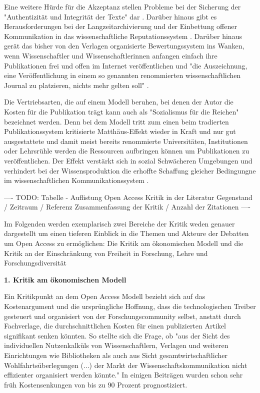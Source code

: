 Eine weitere Hürde für die Akzeptanz stellen Probleme bei der Sicherung der "Authentizität und Integrität der Texte" dar \cite{weishaupt_2009_goldenOA}. Darüber hinaus gibt es Herausforderungen bei der Langzeitarchivierung \cite{hagner_2015_sache_buches} \cite{Martin_2013} und der Einbettung offener Kommunikation in das wissenschaftliche Reputationssystem \cite{weishaupt_2009_goldenOA} \cite{Suber_2002} \cite{Adema_2014_open_access}. Darüber hinaus gerät das bisher von den Verlagen organisierte Bewertungssystem ins Wanken, wenn Wissenschaftler und Wissenschaftlerinnen anfangen einfach ihre Publikationen frei und offen im Internet veröffentlichen und "die Auszeichnung, eine Veröffentlichung in einem so genannten renommierten wissenschaftlichen Journal zu platzieren, nichts mehr gelten soll" \cite{Schirmbacher_oa_2007}.

Die Vertriebsarten, die auf einem Modell beruhen, bei denen der Autor die Kosten für die Publikation trägt kann auch als "Sozialismus für die Reichen" \cite{cope2014future} bezeichnet werden. Denn bei dem Modell tritt zum einen beim tradierten Publikationssystem kritisierte Matthäus-Effekt wieder in Kraft und nur gut ausgestattete und damit meist bereits renommierte Universitäten, Institutionen oder Lehrsrühle werden die Ressourcen aufbringen können um Publikationen zu veröffentlichen. Der Effekt verstärkt sich in sozial Schwächeren Umgebungen und verhindert bei der Wissensproduktion die erhoffte Schaffung gleicher Bedingungne im wissenschaftlichen Kommunikationssystem \cite{suchen}.

---- TODO: Tabelle - Auflistung Open Access Kritik in der Literatur
Gegenstand / Zeitraum / Referenz Zusammenfassung der Kritik / Anzahl der Zitationen ----

Im Folgenden werden exemplarisch zwei Bereiche der Kritik weden genauer dargestellt um einen tieferen Einblick in die Themen und Akteure der Debatten um Open Access zu ermöglichen: Die Kritik am ökonomischen Modell und die Kritik an der Einschränkung von Freiheit in Forschung, Lehre und Forschungsdiversität

\textbf{1. Kritik am ökonomischen Modell}

Ein Kritikpunkt an dem Open Access Modell bezieht sich auf das Kostenargument und die ursprüngliche Hoffnung, dass die technologischen Treiber gesteuert und organisiert von der Forschungscommunity selbst, anstatt durch Fachverlage, die durchschnittlichen Kosten für einen publizierten Artikel signifikant senken könnten. So stellte sich die Frage, ob "aus der Sicht des individuellen Nutzenkalküls von Wissenschaftlern, Verlagen und weiteren Einrichtungen wie Bibliotheken als auch aus Sicht gesamtwirtschaftlicher Wohlfahrtsüberlegungen (...) der Markt der Wissenschaftskommunikation nicht effizienter organisiert werden könnte."\cite{Hess_2006} In einigen Beiträgen wurden schon sehr früh Kostensenkungen von bis zu 90 Prozent \cite{hilf_2004} \cite{suchen} prognostiziert.

